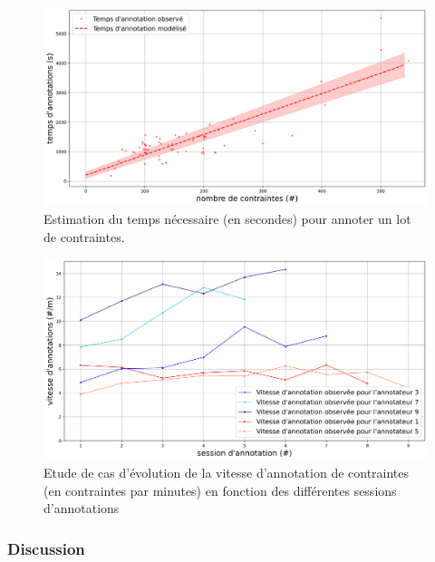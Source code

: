			\begin{figure}[H]
				\centering
				\includegraphics[width=\textwidth]{figures/etude-temps-annotation-1-modelisation-temps}
				\caption{Estimation du temps nécessaire (en secondes) pour annoter un lot de contraintes.}
				\label{figure:4.3.2-ETUDE-COUTS-TEMPS-ANNOTATION-SIMULATION}
			\end{figure}
			
		
			\begin{figure}[H]
				\centering
				\includegraphics[width=\textwidth]{figures/etude-temps-annotation-3-etude-de-cas}
				\caption{Etude de cas d'évolution de la vitesse d'annotation de contraintes (en contraintes par minutes) en fonction des différentes sessions d'annotations}
				\label{figure:4.3.2-ETUDE-COUTS-TEMPS-ANNOTATION-EXEMPLE}
			\end{figure}

		\subsubsection{Discussion}
		
